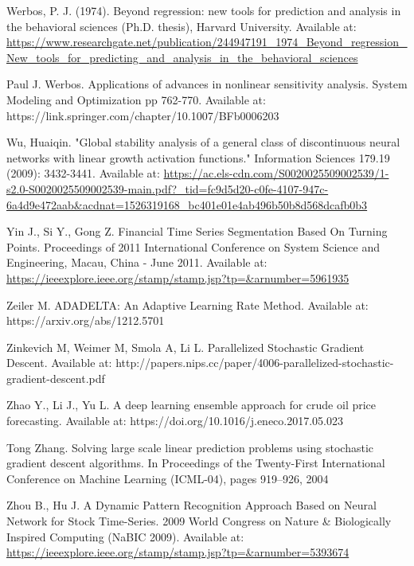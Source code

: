 \documentclass[a4paper,latin]{paper}
\begin{document}
\begin{thebibliography}{bibliography}
Werbos, P. J. (1974). Beyond regression: new tools for prediction and analysis in the behavioral sciences (Ph.D. thesis), Harvard 
University. Available at: \url{https://www.researchgate.net/publication/244947191_1974_Beyond_regression_New_tools_for_predicting_and_analysis_in_the_behavioral_sciences}

Paul J. Werbos. Applications of advances in nonlinear sensitivity analysis. 
System Modeling and Optimization pp 762-770. Available at: https://link.springer.com/chapter/10.1007/BFb0006203

Wu, Huaiqin. "Global stability analysis of a general class of discontinuous neural networks with linear growth activation functions." Information Sciences 179.19 (2009): 3432-3441.
Available at: \url{https://ac.els-cdn.com/S0020025509002539/1-s2.0-S0020025509002539-main.pdf?_tid=fc9d5d20-c0fe-4107-947c-6a4d9e472aab&acdnat=1526319168_bc401e01e4ab496b50b8d568dcafb0b3}

Yin J., Si Y., Gong Z. Financial Time Series Segmentation Based On Turning 
Points. Proceedings of 2011 International Conference on System Science and Engineering, Macau, China - June 
2011. Available at: \url{https://ieeexplore.ieee.org/stamp/stamp.jsp?tp=&arnumber=5961935}

Zeiler M. ADADELTA: An Adaptive Learning Rate Method. Available at: https://arxiv.org/abs/1212.5701

Zinkevich M, Weimer M, Smola A, Li L. Parallelized Stochastic Gradient Descent. 
Available at: 
http://papers.nips.cc/paper/4006-parallelized-stochastic-gradient-descent.pdf

Zhao Y., Li J., Yu L. A deep learning ensemble approach for crude oil price 
forecasting.  Available at: https://doi.org/10.1016/j.eneco.2017.05.023

Tong Zhang. Solving large scale linear prediction problems using stochastic gradient descent algorithms. In Proceedings of the Twenty-First International Conference on Machine Learning (ICML-04), pages 919–926, 2004

Zhou B., Hu J. A Dynamic Pattern Recognition Approach Based on Neural Network for Stock Time-Series. 2009 World Congress on Nature \& Biologically Inspired Computing (NaBIC 
2009). Available at:\url{ https://ieeexplore.ieee.org/stamp/stamp.jsp?tp=&arnumber=5393674}

\end{thebibliography}
\end{document}
